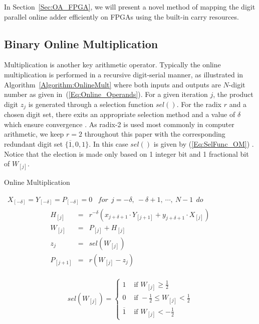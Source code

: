 \documentclass[conference]{IEEEtran}
\begin{document}
In Section~\ref{Sec:OA_FPGA}, we will present a novel method of mapping the digit parallel online adder efficiently on FPGAs using the built-in carry resources.

\subsection{Binary Online Multiplication}
Multiplication is another key arithmetic operator. Typically the online multiplication is performed in a recursive digit-serial manner, as illustrated in Algorithm~\ref{Algorithm:OnlineMult} \cite{Ercegovac_OnlineMult} where both inputs and outputs are $N$-digit number as given in~(\ref{Eq:Online_Operands}). For a given iteration $j$, the product digit $z_j$ is generated through a selection function $sel()$. For the radix $r$ and a chosen digit set, there exits an appropriate selection method and a value of $\delta$ which ensure convergence \cite{Ercegovac_OnlineMult}. As radix-2 is used most commonly in computer arithmetic, we keep $r=2$ throughout this paper with the corresponding redundant digit set $\{\overline{1},0,1\}$. In this case $sel()$ is given by (\ref{Eq:SelFunc_OM}) \cite{Oregon_OnlineNetwork}. Notice that the election is made only based on 1 integer bit and 1 fractional bit of $W_{[j]}$.

\begin{algorithm}[tbp]
  \caption{Online Multiplication}
  \begin{algorithmic}[1]
    \REQUIRE~$X_{[-\delta]}=Y_{[-\delta]}=P_{[-\delta]}=0$
    \ENSURE~$for~~ j=-\delta,~-\delta+1,~\cdots,~N-1 ~~do$
      \begin{eqnarray}\label{Eq:OnlineMult_General}
        \begin{matrix}
          H_{[j]}   & = & r^{-\delta}\left(x_{j+\delta+1}\cdot Y_{[j+1]}+y_{j+\delta+1}\cdot X_{[j]}\right)\\
          W_{[j]}   & = & P_{[j]} + H_{[j]}\\
          z_j       & = & sel(W_{[j]})\\
          P_{[j+1]} & = & r\left(W_{[j]}-z_j\right)
        \end{matrix}
      \end{eqnarray}
  \label{Algorithm:OnlineMult}
  \vspace{-2ex}
  \end{algorithmic}
\end{algorithm}

\begin{eqnarray}\label{Eq:SelFunc_OM}
  sel(W_{[j]})=\begin{cases}
    1 & \text{ if } W_{[j]} \geqslant \frac{1}{2} \\
    0 & \text{ if } -\frac{1}{2}\leqslant W_{[j]}<\frac{1}{2} \\
    \overline{1} & \text{ if } W_{[j]}<-\frac{1}{2}
  \end{cases}
\end{eqnarray}
\end{document}

